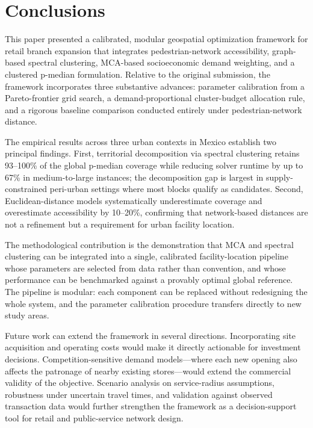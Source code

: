 \section{Conclusions}
\label{sec:conclusion}

This paper presented a calibrated, modular geospatial optimization framework
for retail branch expansion that integrates pedestrian-network accessibility,
graph-based spectral clustering, MCA-based socioeconomic demand weighting,
and a clustered \mbox{p-median} formulation.
Relative to the original submission, the framework incorporates three
substantive advances: parameter calibration from a Pareto-frontier grid search,
a demand-proportional cluster-budget allocation rule, and a rigorous baseline
comparison conducted entirely under pedestrian-network distance.

The empirical results across three urban contexts in Mexico establish two
principal findings.
First, territorial decomposition via spectral clustering retains
93--100\% of the global \mbox{p-median} coverage while reducing
solver runtime by up to 67\% in medium-to-large instances;
the decomposition gap is largest in supply-constrained peri-urban
settings where most blocks qualify as candidates.
Second, Euclidean-distance models systematically underestimate coverage
and overestimate accessibility by 10--20\%, confirming that network-based
distances are not a refinement but a requirement for urban facility location.

The methodological contribution is the demonstration that MCA and spectral
clustering can be integrated into a single, calibrated facility-location
pipeline whose parameters are selected from data rather than convention,
and whose performance can be benchmarked against a provably optimal global
reference.
The pipeline is modular: each component can be replaced without
redesigning the whole system, and the parameter calibration procedure
transfers directly to new study areas.

Future work can extend the framework in several directions.
Incorporating site acquisition and operating costs would make it directly
actionable for investment decisions.
Competition-sensitive demand models---where each new opening also affects
the patronage of nearby existing stores---would extend the commercial
validity of the objective.
Scenario analysis on service-radius assumptions, robustness under uncertain
travel times, and validation against observed transaction data would further
strengthen the framework as a decision-support tool for retail and
public-service network design.
